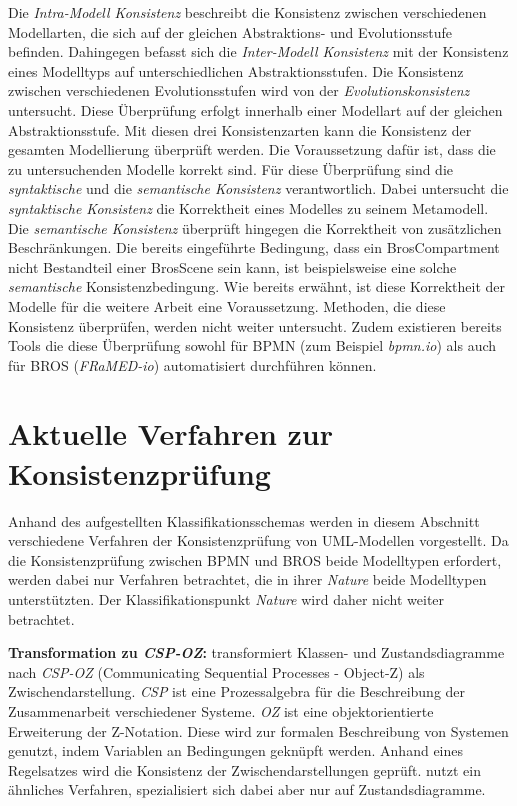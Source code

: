 Die \emph{Intra-Modell Konsistenz} beschreibt die Konsistenz zwischen verschiedenen Modellarten, die sich auf der gleichen Abstraktions- und Evolutionsstufe befinden.
Dahingegen befasst sich die \emph{Inter-Modell Konsistenz} mit der Konsistenz eines Modelltyps auf unterschiedlichen Abstraktionsstufen.
Die Konsistenz zwischen verschiedenen Evolutionsstufen wird von der \emph{Evolutionskonsistenz} untersucht.
Diese Überprüfung erfolgt innerhalb einer Modellart auf der gleichen Abstraktionsstufe.
Mit diesen drei Konsistenzarten kann die Konsistenz der gesamten Modellierung überprüft werden.
Die Voraussetzung dafür ist, dass die zu untersuchenden Modelle korrekt sind.
Für diese Überprüfung sind die \emph{syntaktische} und die \emph{semantische Konsistenz} verantwortlich.
Dabei untersucht die \emph{syntaktische Konsistenz} die Korrektheit eines Modelles zu seinem Metamodell.
Die \emph{semantische Konsistenz} überprüft hingegen die Korrektheit von zusätzlichen Beschränkungen.
Die bereits eingeführte Bedingung, dass ein BrosCompartment nicht Bestandteil einer BrosScene sein kann, ist beispielsweise eine solche \emph{semantische} Konsistenzbedingung.
Wie bereits erwähnt, ist diese Korrektheit der Modelle für die weitere Arbeit eine Voraussetzung.
Methoden, die diese Konsistenz überprüfen, werden nicht weiter untersucht.
Zudem existieren bereits Tools die diese Überprüfung sowohl für BPMN (zum Beispiel \emph{bpmn.io}) als auch für BROS (\emph{FRaMED-io}) automatisiert durchführen können.

\section{Aktuelle Verfahren zur Konsistenzprüfung}

Anhand des aufgestellten Klassifikationsschemas werden in diesem Abschnitt verschiedene Verfahren der Konsistenzprüfung von UML-Modellen vorgestellt.
Da die Konsistenzprüfung zwischen BPMN und BROS beide Modelltypen erfordert, werden dabei nur Verfahren betrachtet, die in ihrer \emph{Nature} beide Modelltypen unterstützten.
Der Klassifikationspunkt \emph{Nature} wird daher nicht weiter betrachtet.

\textbf{Transformation zu \emph{CSP-OZ}:}
\cite{Rasch2003} transformiert Klassen- und Zustandsdiagramme nach \emph{CSP-OZ} (Communicating Sequential Processes - Object-Z) als Zwischendarstellung.
\emph{CSP} ist eine Prozessalgebra für die Beschreibung der Zusammenarbeit verschiedener Systeme. 
\emph{OZ} ist eine objektorientierte Erweiterung der Z-Notation.
Diese wird zur formalen Beschreibung von Systemen genutzt, indem Variablen an Bedingungen geknüpft werden.
Anhand eines Regelsatzes wird die Konsistenz der Zwischendarstellungen geprüft.
\cite{Kim2004} nutzt ein ähnliches Verfahren, spezialisiert sich dabei aber nur auf Zustandsdiagramme.

